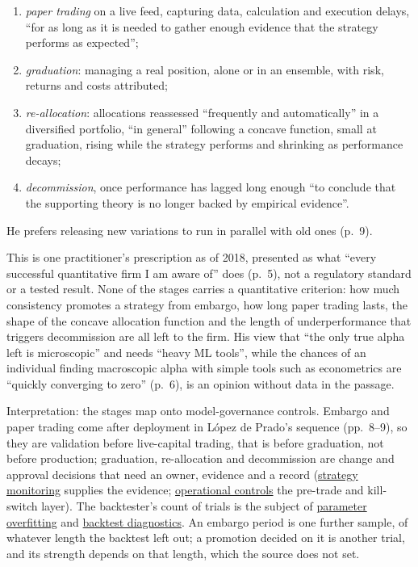 \begin{qfmethod}
\begin{itemize}
\begin{enumerate}
  \item \emph{paper trading} on a live feed, capturing data, calculation and execution delays, ``for as long as it is needed to gather enough evidence that the strategy performs as expected'';
  \item \emph{graduation}: managing a real position, alone or in an ensemble, with risk, returns and costs attributed;
  \item \emph{re-allocation}: allocations reassessed ``frequently and automatically'' in a diversified portfolio, ``in general'' following a concave function, small at graduation, rising while the strategy performs and shrinking as performance decays;
  \item \emph{decommission}, once performance has lagged long enough ``to conclude that the supporting theory is no longer backed by empirical evidence''.
  \end{enumerate}
\end{itemize}
He prefers releasing new variations to run in parallel with old ones (p.~9).

 This is one practitioner's prescription as of 2018, presented as what ``every successful quantitative firm I am aware of'' does (p.~5), not a regulatory standard or a tested result. None of the stages carries a quantitative criterion: how much consistency promotes a strategy from embargo, how long paper trading lasts, the shape of the concave allocation function and the length of underperformance that triggers decommission are all left to the firm. His view that ``the only true alpha left is microscopic'' and needs ``heavy ML tools'', while the chances of an individual finding macroscopic alpha with simple tools such as econometrics are ``quickly converging to zero'' (p.~6), is an opinion without data in the passage.

 Interpretation: the stages map onto model-governance controls. Embargo and paper trading come after deployment in López de Prado's sequence (pp.~8--9), so they are validation before live-capital trading, that is before graduation, not before production; graduation, re-allocation and decommission are change and approval decisions that need an owner, evidence and a record (\hyperref[meth:quant-strategy-monitoring]{strategy monitoring} supplies the evidence; \hyperref[meth:automated-trading-operational-controls]{operational controls} the pre-trade and kill-switch layer). The backtester's count of trials is the subject of \hyperref[pit:parameter-overfitting]{parameter overfitting} and \hyperref[meth:backtest-evaluation-diagnostics]{backtest diagnostics}. An embargo period is one further sample, of whatever length the backtest left out; a promotion decided on it is another trial, and its strength depends on that length, which the source does not set.


\end{qfmethod}
